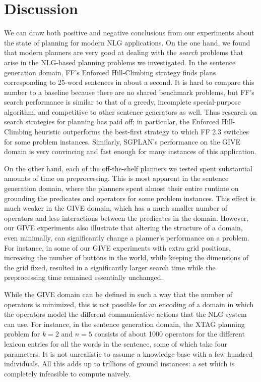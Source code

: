 \section{Discussion}
\label{sec:discussion}

We can draw both positive and negative conclusions from our
experiments about the state of planning for modern NLG
applications. On the one hand, we found that modern planners are very
good at dealing with the \emph{search} problems that arise in the
NLG-based planning problems we investigated.
In the sentence generation domain, FF's Enforced
Hill-Climbing strategy finds plans corresponding to 25-word sentences
in about a second. It is hard to compare this number to a baseline
because there are no shared benchmark problems, but FF's search
performance is similar to that of a greedy, incomplete special-purpose
algorithm, and competitive to other sentence generators as well. Thus
research on search strategies for planning has paid off; in
particular, the Enforced Hill-Climbing heuristic outperforms the
best-first strategy to which FF 2.3 switches for some problem
instances. Similarly, SGPLAN's performance on the GIVE domain is very
convincing and fast enough for many instances of this application.

On the other hand, each of the off-the-shelf planners we tested spent
substantial amounts of time on preprocessing. This is most apparent in the
sentence generation domain, where the planners spent almost their entire
runtime on grounding the predicates and operators for some problem instances.
This effect is much weaker in the GIVE domain, which has a much smaller
number of operators and less interactions between the predicates in the
domain. However, our GIVE experiments also illustrate that altering the
structure of a domain, even minimally, can significantly change a planner's
performance on a problem. For instance, in some of our GIVE experiments with
extra grid positions, increasing the number of buttons in the world, while
keeping the dimensions of the grid fixed, resulted in a significantly larger
search time while the preprocessing time remained essentially unchanged.

While the GIVE domain can be defined in such a way that the number of
operators is minimized, this is not possible for an encoding of a domain in
which the operators model the different communicative actions that the NLG
system can use. For instance, in the sentence generation domain, the XTAG
planning problem for $k=2$ and $n=5$ consists of about 1000 operators for the
different lexicon entries for all the words in the sentence, some of which
take four parameters. It is not unrealistic to assume a knowledge base with a
few hundred individuals. All this adds up to trillions of ground
instances: a set which is completely infeasible to compute naively.


